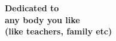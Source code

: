 \vspace*{1.0in}
\begin {center}
\textbf{\Large Dedicated to \\
          any body you like \\
          (like teachers, family etc)}


%
%
%
%
%

\end{center}
